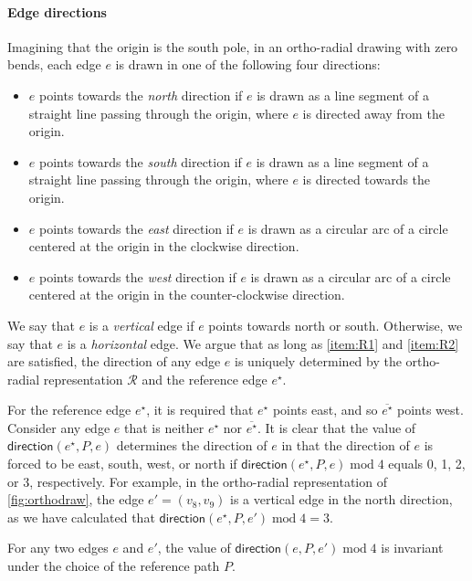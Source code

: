 \documentclass{theoretics}
\newcommand{\RR}{\mathcal{R}}
\newcommand{\direction}{\mathsf{direction}}
\newcommand{\eref}{e^\star}
\renewcommand{\mod}{\operatorname{mod}}
\begin{document}
\paragraph{Edge directions} Imagining that the origin is the south pole, in an ortho-radial drawing with zero bends, each edge $e$ is drawn in one of the following four directions: 
\begin{itemize}
\item $e$ points towards the \emph{north} direction if $e$ is drawn as a line segment of a straight line passing through the origin, where $e$ is directed away from the origin.
\item $e$ points towards the \emph{south} direction if $e$ is drawn as a line segment of a straight line passing through the origin, where $e$ is directed towards the origin.
\item $e$ points towards the \emph{east} direction if $e$ is drawn as a circular arc of a circle centered at the origin in the clockwise direction.
\item $e$ points towards the \emph{west} direction if $e$ is drawn as a circular arc of a circle centered at the origin in the counter-clockwise direction.
\end{itemize}

We say that $e$ is a \emph{vertical} edge if $e$ points towards north or south.  Otherwise, we say that $e$ is a \emph{horizontal} edge. We argue that as long as  \ref{item:R1} and \ref{item:R2} are satisfied,  the direction of any edge $e$ is uniquely determined by the ortho-radial representation $\RR$ and the reference edge $\eref$. 


For the reference edge $\eref$, it is required that $\eref$ points east, and so $\overline{\eref}$ points west. 
Consider any edge $e$ that is neither $\eref$ nor $\overline{\eref}$. It is clear that the value of $\direction(\eref, P, e)$ determines the direction of $e$ in that the direction of $e$ is forced to be east, south, west, or north if $\direction(\eref, P, e) \mod 4$ equals 0, 1, 2, or 3, respectively. For example, in the ortho-radial representation of \cref{fig:orthodraw}, the edge $e' = (v_8, v_9)$ is a vertical edge in the north direction, as we have calculated that  $\direction(\eref, P, e') \mod 4 = 3$.

\begin{lemma}\label{lem-prelim-dir-1}
For any two edges $e$ and $e'$, the value of $\direction(e, P, e') \mod 4$ is invariant under the choice of the reference path $P$.
\end{lemma}
\end{document}
